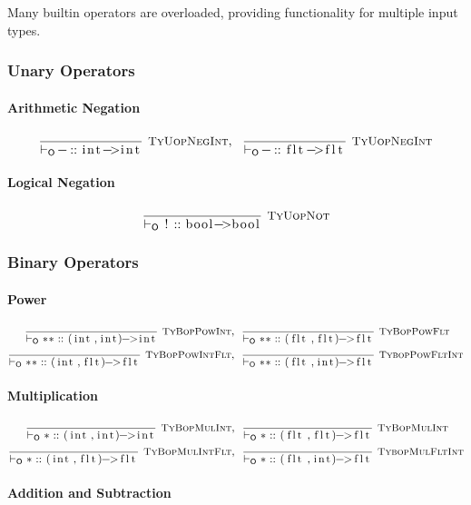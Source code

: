 \documentclass{article}
\newcommand{\code}[1]{\lstinline[columns=fixed]{#1}}
\newcommand{\drmrule}[5]{\frac{#1}{#2\vdash_{\mathsf{#3}}#4}\textsc{\ \small{#5}}}
\newcommand{\mc}[1]{\textnormal{\code{#1}}}
\newcommand{\subsubsubsection}{\paragraph}
\begin{document}
			Many builtin operators are overloaded, providing functionality for multiple input types.
			
			\subsubsection{Unary Operators}
			
				\subsubsubsection{Arithmetic Negation}
				
					\begin{align*}
						\drmrule{}{}{O}{\mc{-} :: \mc{int->int}}{TyUopNegInt},\ \ 
						\drmrule{}{}{O}{\mc{-} :: \mc{flt->flt}}{TyUopNegInt}
					\end{align*}
				
				\subsubsubsection{Logical Negation}

					\begin{align*}
						\drmrule{}{}{O}{\mc{!} :: \mc{bool->bool}}{TyUopNot}
					\end{align*}
			
			\subsubsection{Binary Operators}
			
				\subsubsubsection{Power}
				
					\begin{align*}
						\drmrule{}{}{O}{\mc{**} :: \mc{(int,int)->int}}{TyBopPowInt},\ \ &
						\drmrule{}{}{O}{\mc{**} :: \mc{(flt,flt)->flt}}{TyBopPowFlt}\\
						\drmrule{}{}{O}{\mc{**} :: \mc{(int,flt)->flt}}{TyBopPowIntFlt},\ \ &
						\drmrule{}{}{O}{\mc{**} :: \mc{(flt,int)->flt}}{TybopPowFltInt}
					\end{align*}
				
				\subsubsubsection{Multiplication}
				
					\begin{align*}
						\drmrule{}{}{O}{\mc{*} :: \mc{(int,int)->int}}{TyBopMulInt},\ \ &
						\drmrule{}{}{O}{\mc{*} :: \mc{(flt,flt)->flt}}{TyBopMulInt}\\
						\drmrule{}{}{O}{\mc{*} :: \mc{(int,flt)->flt}}{TyBopMulIntFlt},\ \ &
						\drmrule{}{}{O}{\mc{*} :: \mc{(flt,int)->flt}}{TybopMulFltInt}
					\end{align*}
				
				\subsubsubsection{Addition and Subtraction}
				
\end{document}
